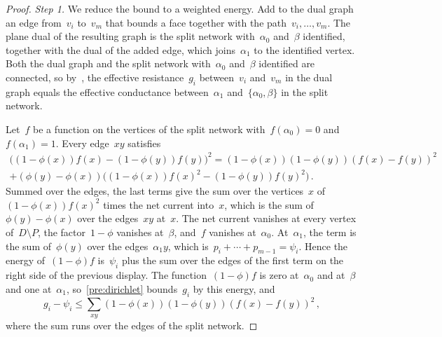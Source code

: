 \documentclass[11pt]{amsart}
\numberwithin{equation}{section}
\begin{document}
\begin{proof}
\emph{Step 1.} We reduce the bound to a weighted energy. Add to the dual graph an edge from~$v_i$ to~$v_m$ that bounds a face together with the path~$v_i,\ldots,v_m$. The plane dual of the resulting graph is the split network with~$\alpha_0$ and~$\beta$ identified, together with the dual of the added edge, which joins~$\alpha_1$ to the identified vertex. Both the dual graph and the split network with~$\alpha_0$ and~$\beta$ identified are connected, so by~\citet[Proposition~9.4]{LyonsPeres2016}, the effective resistance~$g_i$ between~$v_i$ and~$v_m$ in the dual graph equals the effective conductance between~$\alpha_1$ and~$\{\alpha_0,\beta\}$ in the split network.

Let~$f$ be a function on the vertices of the split network with~$f(\alpha_0)=0$ and~$f(\alpha_1)=1$. Every edge~$xy$ satisfies
\begin{multline*}
 \bigl((1-\phi(x))f(x)-(1-\phi(y))f(y)\bigr)^2=(1-\phi(x))(1-\phi(y))(f(x)-f(y))^2\\
 +(\phi(y)-\phi(x))\bigl((1-\phi(x))f(x)^2-(1-\phi(y))f(y)^2\bigr)\,.
\end{multline*}
Summed over the edges, the last terms give the sum over the vertices~$x$ of~$(1-\phi(x))f(x)^2$ times the net current into~$x$, which is the sum of~$\phi(y)-\phi(x)$ over the edges~$xy$ at~$x$. The net current vanishes at every vertex of~$D\setminus P$, the factor~$1-\phi$ vanishes at~$\beta$, and~$f$ vanishes at~$\alpha_0$. At~$\alpha_1$, the term is the sum of~$\phi(y)$ over the edges~$\alpha_1y$, which is~$p_i+\cdots+p_{m-1}=\psi_i$. Hence the energy of~$(1-\phi)f$ is~$\psi_i$ plus the sum over the edges of the first term on the right side of the previous display. The function~$(1-\phi)f$ is zero at~$\alpha_0$ and at~$\beta$ and one at~$\alpha_1$, so~\eqref{pre:dirichlet} bounds~$g_i$ by this energy, and
\begin{equation*}
 g_i-\psi_i\leq\sum_{xy}(1-\phi(x))(1-\phi(y))(f(x)-f(y))^2\,,
\end{equation*}
where the sum runs over the edges of the split network.


\end{proof}
\end{document}
